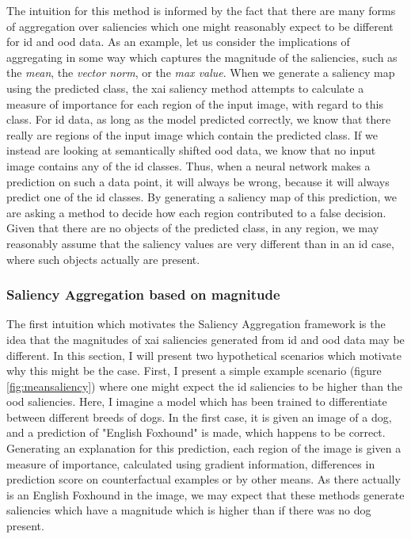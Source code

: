 \documentclass[UKenglish]{uiomasterthesis} %
\theoremstyle{definition}
\begin{document}
The intuition for this method is informed by the fact that there are many forms of aggregation over saliencies which one might reasonably expect to be different for \ac{id} and \ac{ood} data. As an example, let us consider the implications of aggregating in some way which captures the magnitude of the saliencies, such as the {\it mean}, the {\it vector norm}, or the {\it max value}. When we generate a saliency map using the predicted class, the \ac{xai} saliency method attempts to calculate a measure of importance for each region of the input image, with regard to this class. For \ac{id} data, as long as the model predicted correctly, we know that there really are regions of the input image which contain the predicted class. If we instead are looking at semantically shifted \ac{ood} data, we know that no input image contains any of the \ac{id} classes. Thus, when a neural network makes a prediction on such a data point, it will always be wrong, because it will always predict one of the \ac{id} classes. By generating a saliency map of this prediction, we are asking a method to decide how each region contributed to a false decision. Given that there are no objects of the predicted class, in any region, we may reasonably assume that the saliency values are very different than in an \ac{id} case, where such objects actually are present.

\subsubsection{Saliency Aggregation based on magnitude}

The first intuition which motivates the Saliency Aggregation framework is the idea that the magnitudes of \ac{xai} saliencies generated from \ac{id} and \ac{ood} data may be different. In this section, I will present two hypothetical scenarios which motivate why this might be the case. First, I present a simple example scenario (figure \ref{fig:meansaliency}) where one might expect the \ac{id} saliencies to be higher than the \ac{ood} saliencies. Here, I imagine a model which has been trained to differentiate between different breeds of dogs. In the first case, it is given an image of a dog, and a prediction of "English Foxhound" is made, which happens to be correct. Generating an explanation for this prediction, each region of the image is given a measure of importance, calculated using gradient information, differences in prediction score on counterfactual examples or by other means. As there actually is an English Foxhound in the image, we may expect that these methods generate saliencies which have a magnitude which is higher than if there was no dog present.
\end{document}
